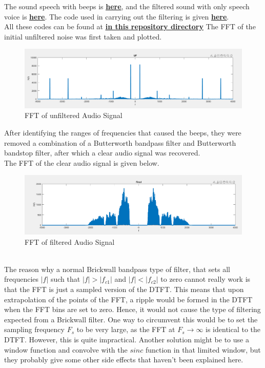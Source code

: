 \documentclass[oneside]{book}
\begin{document}
The sound speech with beeps is \href{https://github.com/HarryNyquist/Elektronica/blob/main/Signal_Processing/Audio_Filtering/Noise_Removal.wav}{\underline{\textbf{here}}}, and the filtered sound with only speech voice is \href{https://github.com/HarryNyquist/Elektronica/blob/main/Signal_Processing/Audio_Filtering/Filtered_output.wav}{\underline{\textbf{here}}}. The code used in carrying out the filtering is given \href{https://github.com/HarryNyquist/Elektronica/blob/main/Signal_Processing/Audio_Filtering/Bandpass_filter.m}{\underline{\textbf{here}}}.\\
All these codes can be found at \href{https://github.com/HarryNyquist/Elektronica/blob/main/Signal_Processing/Audio_Filtering/Bandpass_filter.m}{\underline{\textbf{in this repository directory}}}
The FFT of the initial unfiltered noise was first taken and plotted.
\begin{figure}[htbp]
    \centering
    \includegraphics[width=1\textwidth]{figs/Unfiltered_Audio_Signal.png}
    \caption{FFT of unfiltered Audio Signal}
\end{figure}
\newpage
After identifying the ranges of frequencies that caused the beeps, they were removed a combination of a Butterworth bandpass filter and Butterworth bandstop filter, after which a clear audio signal was recovered. \\
The FFT of the clear audio signal is given below.
\begin{figure}[htbp]
    \centering
    \includegraphics[width=1\textwidth]{figs/Filtered_Audio_Signal.png}
    \caption{FFT of filtered Audio Signal}
\end{figure}
\\ \bigskip
The reason why a normal Brickwall bandpass type of filter, that sets all frequencies $|f|$ such that $|f| > |f_{c1}|$ and $|f| < |f_{c2}|$ to zero cannot really work is that the FFT is just a sampled version of the DTFT. This means that upon extrapolation of the points of the FFT, a ripple would be formed in the DTFT when the FFT bins are set to zero. Hence, it would not cause the type of filtering expected from a Brickwall filter. One way to circumvent this would be to set the sampling frequency $F_s$ to be very large, as the FFT at $F_s \rightarrow \infty$ is identical to the DTFT. However, this is quite impractical. Another solution might be to use a window function and convolve with the $sinc$ function in that limited window, but they probably give some other side effects that haven't been explained here.
\end{document}
